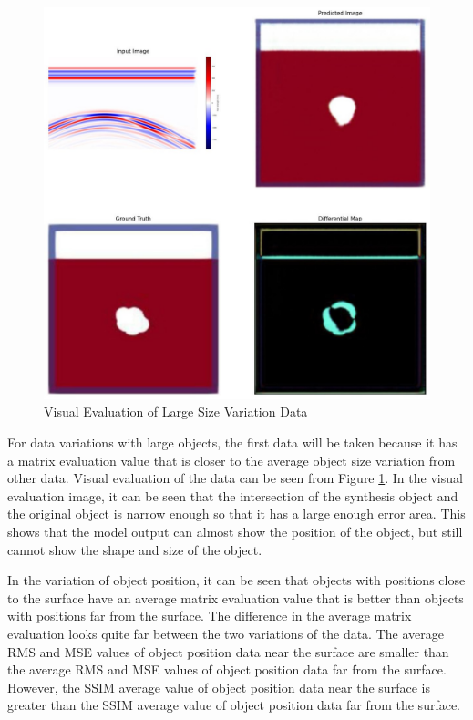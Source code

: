 \documentclass[conference]{IEEEtran}
\begin{document}
\begin{figure}[ht]
  \centering
  \includegraphics[scale=0.15]{gambar/diffMapBesar.jpg}
  \caption{Visual Evaluation of Large Size Variation Data}
  \label{fig:diffmapbesar}
\end{figure}

For data variations with large objects, the first data will be taken because it has a matrix evaluation value that is closer to the average object size variation from other data.
Visual evaluation of the data can be seen from Figure \ref{fig:diffmapbesar}.
In the visual evaluation image, it can be seen that the intersection of the synthesis object and the original object is narrow enough so that it has a large enough error area.
This shows that the model output can almost show the position of the object, but still cannot show the shape and size of the object.

In the variation of object position, it can be seen that objects with positions close to the surface have an average matrix evaluation value that is better than objects with positions far from the surface.
The difference in the average matrix evaluation looks quite far between the two variations of the data.
The average RMS and MSE values of object position data near the surface are smaller than the average RMS and MSE values of object position data far from the surface.
However, the SSIM average value of object position data near the surface is greater than the SSIM average value of object position data far from the surface.
\end{document}
